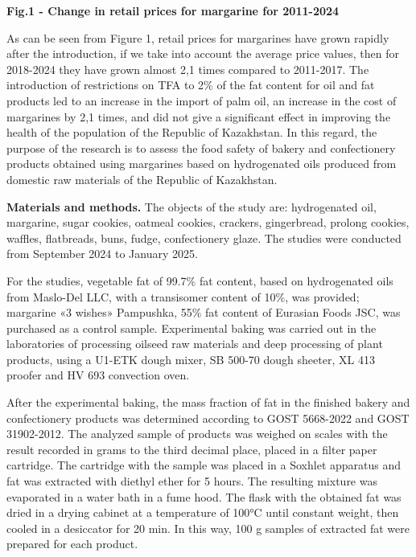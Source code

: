{\bfseries Fig.1 - Change in retail prices for margarine for 2011-2024}

\begin{multicols}{2}
As can be seen from Figure 1, retail prices for margarines have grown
rapidly after the introduction, if we take into account the average
price values, then for 2018-2024 they have grown almost 2,1 times
compared to 2011-2017. The introduction of restrictions on TFA to 2\% of
the fat content for oil and fat products led to an increase in the
import of palm oil, an increase in the cost of margarines by 2,1 times,
and did not give a significant effect in improving the health of the
population of the Republic of Kazakhstan. In this regard, the purpose of
the research is to assess the food safety of bakery and confectionery
products obtained using margarines based on hydrogenated oils produced
from domestic raw materials of the Republic of Kazakhstan.

{\bfseries Materials and methods.} The objects of the study are:
hydrogenated oil, margarine, sugar cookies, oatmeal cookies, crackers,
gingerbread, prolong cookies, waffles, flatbreads, buns, fudge,
confectionery glaze. The studies were conducted from September 2024 to
January 2025.

For the studies, vegetable fat of 99.7\% fat content, based on
hydrogenated oils from Maslo-Del LLC, with a transisomer content of
10\%, was provided; margarine «3 wishes» Pampushka, 55\% fat content of
Eurasian Foods JSC, was purchased as a control sample. Experimental
baking was carried out in the laboratories of processing oilseed raw
materials and deep processing of plant products, using a U1-ETK dough
mixer, SB 500-70 dough sheeter, XL 413 proofer and HV 693 convection
oven.

After the experimental baking, the mass fraction of fat in the finished
bakery and confectionery products was determined according to GOST
5668-2022 and GOST 31902-2012. The analyzed sample of products was
weighed on scales with the result recorded in grams to the third decimal
place, placed in a filter paper cartridge. The cartridge with the sample
was placed in a Soxhlet apparatus and fat was extracted with diethyl
ether for 5 hours. The resulting mixture was evaporated in a water bath
in a fume hood. The flask with the obtained fat was dried in a drying
cabinet at a temperature of 100°C until constant weight, then cooled in
a desiccator for 20 min. In this way, 100 g samples of extracted fat
were prepared for each product.


\end{multicols}
